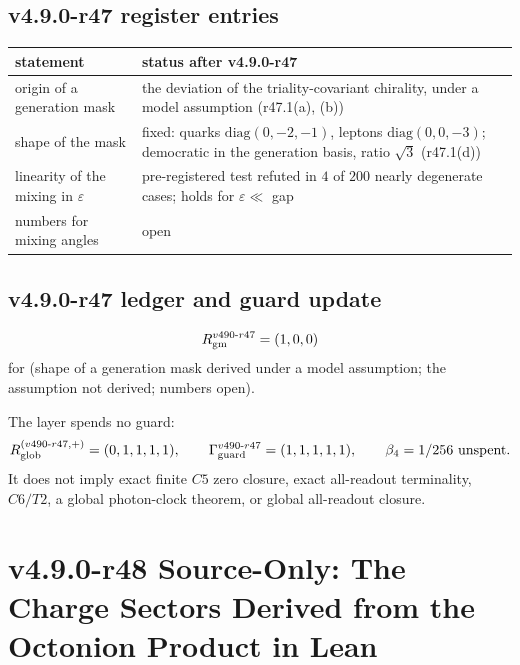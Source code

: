 \subsection*{v4.9.0-r47 register entries}
\label{subsec:v490-r47-register}

\begin{center}
\small
\begin{tabular}{@{}>{\raggedright\arraybackslash}p{}>{\raggedright\arraybackslash}p{}@{}}
\toprule
statement & status after v4.9.0-r47\\
\midrule
origin of a generation mask & the deviation of the triality-covariant chirality, under a model assumption (r47.1(a), (b))\\
shape of the mask & fixed: quarks \(\mathrm{diag}(0,-2,-1)\), leptons \(\mathrm{diag}(0,0,-3)\); democratic in the generation basis, ratio \(\sqrt3\) (r47.1(d))\\
linearity of the mixing in \(\varepsilon\) & pre-registered test refuted in \(4\) of \(200\) nearly degenerate cases; holds for \(\varepsilon\ll\) gap\\
numbers for mixing angles & open\\
\bottomrule
\end{tabular}
\end{center}

\subsection*{v4.9.0-r47 ledger and guard update}
\label{subsec:v490-r47-ledger-guard}

\[
R_{\rm gm}^{v490\text{-}r47}=(1,0,0)
\]
for (shape of a generation mask derived under a model assumption; the assumption not derived; numbers open).

The layer spends no guard:
\[
R_{\rm glob}^{(v490\text{-}r47,+)}=(0,1,1,1,1),
\qquad
\Gamma_{\rm guard}^{v490\text{-}r47}=(1,1,1,1,1),
\qquad
\beta_4=1/256\ \text{unspent}.
\]
It does not imply exact finite \(C5\) zero closure, exact all-readout terminality,
\(C6/T2\), a global photon-clock theorem, or global all-readout closure.

\clearpage
\section*{v4.9.0-r48 Source-Only: The Charge Sectors Derived from the Octonion Product in Lean}
\label{sec:v490-r48-sectors-formal}

